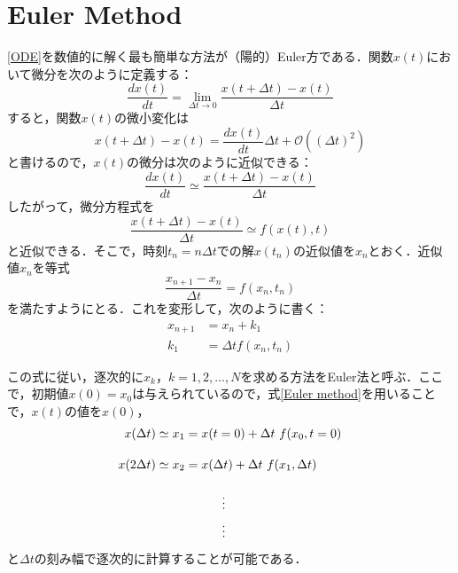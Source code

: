 \documentclass[12pt]{jsarticle}\usepackage{ifthen}\newboolean{enlarge}\setboolean{enlarge}{false}
\newcommand{\nn}{\notag \\}
\begin{document}
\section{Euler Method}
\eqref{ODE}を数値的に解く最も簡単な方法が（陽的）Euler方である．関数$x(t)$において微分を次のように定義する：
\begin{equation}
	\frac{dx(t)}{dt}=\lim_{\Delta t\to0}\frac{x(t+\Delta t)-x(t)}{\Delta t}
\end{equation}
すると，関数$x(t)$の微小変化は
\begin{equation}
	x(t+\Delta t)-x(t)=\frac{dx(t)}{dt}\Delta t+\mathcal{O}((\Delta t)^2)
\end{equation}
と書けるので，$x(t)$の微分は次のように近似できる：
\begin{equation}
	\frac{dx(t)}{dt}\simeq\frac{x(t+\Delta t)-x(t)}{\Delta t}
\end{equation}
したがって，微分方程式を
\begin{equation}
	\frac{x(t+\Delta t)-x(t)}{\Delta t}
	\simeq f(x(t),t)
\end{equation}
と近似できる．そこで，時刻$t_n=n\Delta t$での解$x(t_n)$の近似値を$x_n$とおく．近似値$x_n$を等式
\begin{equation}
	\frac{x_{n+1}-x_n}{\Delta t} = f(x_n,t_n)
\end{equation}
を満たすようにとる．これを変形して，次のように書く：
\begin{align}\label{Euler method}
	x_{n+1}&=x_n+k_1\\[10pt]
	k_1&=\Delta t f(x_n, t_n)
\end{align}

この式に従い，逐次的に$x_k$，$k = 1,2,\ldots,N$を求める方法をEuler法と呼ぶ．ここで，初期値$x(0)=x_0$は与えられているので，式\eqref{Euler method}を用いることで，$x(t)$の値を$x(0)$，
\begin{align}
	x(\Delta t)\simeq x_1&=x(t=0) +\Delta t\ f(x_0,t=0)\\[10pt]
	x(2\Delta t)\simeq x_2&=x(\Delta t) +\Delta t\ f(x_1,\Delta t)\\[10pt]
	&\hspace{30pt}\vdots\nn
	&\hspace{30pt}\vdots\notag
\end{align}
と$\Delta t$の刻み幅で逐次的に計算することが可能である．
\end{document}
